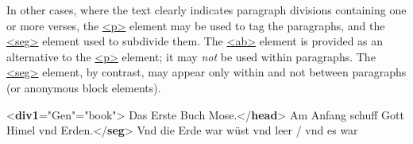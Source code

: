 In other cases, where the text clearly indicates paragraph divisions containing one or more verses, the \hyperref[TEI.p]{<p>} element may be used to tag the paragraphs, and the \hyperref[TEI.seg]{<seg>} element used to subdivide them. The \hyperref[TEI.ab]{<ab>} element is provided as an alternative to the \hyperref[TEI.p]{<p>} element; it may \textit{not} be used within paragraphs. The \hyperref[TEI.seg]{<seg>} element, by contrast, may appear only within and not between paragraphs (or anonymous block elements). \par\bgroup{}\exampleFont \begin{shaded}\noindent\mbox{}{<\textbf{div1}\hspace*{1em}{n}="{Gen}"\hspace*{1em}{type}="{book}">}\mbox{}\newline 
{}Das Erste Buch Mose.{</\textbf{head}>}\mbox{}\newline 
{}\mbox{}\newline 
\hspace*{1em}\mbox{}\newline 
\hspace*{1em}\hspace*{1em}Am Anfang schuff Gott Himel vnd Erden.{</\textbf{seg}>}\mbox{}\newline 
\hspace*{1em}\hspace*{1em}Vnd die Erde war wüst vnd leer / vnd es war\mbox{}\newline 

\end{shaded}
